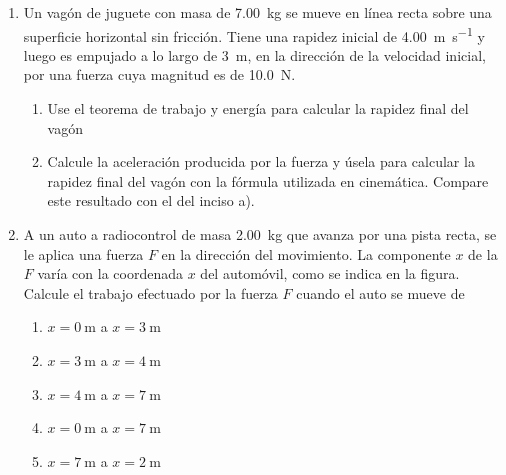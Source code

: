 \documentclass[Física - Práctica.root.tex]{subfiles}
\begin{document}
\begin{enumerate}
\begin{enumerate}
        \end{enumerate}

  \item Un vagón de juguete con masa de \SI{7,00}{\kilo\gram} se mueve en línea recta sobre una superficie
        horizontal sin fricción. Tiene una rapidez inicial de \SI{4,00}{\meter\per\second} y luego es empujado a lo
        largo de \SI{3}{\meter}, en la dirección de la velocidad inicial, por una fuerza cuya magnitud es de
        \SI{10,0}{\newton}.
        \begin{enumerate}
          \item Use el teorema de trabajo y energía para calcular la rapidez final del vagón
          \item Calcule la aceleración producida por la fuerza y úsela para calcular la rapidez final
                del vagón con la fórmula utilizada en cinemática. Compare este resultado con el del
                inciso a).
        \end{enumerate}

  \item A un auto a radiocontrol de masa \SI{2,00}{\kilo\gram} que avanza por una pista recta, se le aplica una
        fuerza $F$ en la dirección del movimiento. La componente $x$ de la $F$ varía con la coordenada
        $x$ del automóvil, como se indica en la figura. Calcule el trabajo efectuado por la fuerza $F$
        cuando el auto se mueve de
        \begin{multicols}{2}
          \begin{enumerate}
            \item $x = \SI{0}{\meter}$ a $x = \SI{3}{\meter}$
            \item $x = \SI{3}{\meter}$ a $x = \SI{4}{\meter}$
            \item $x = \SI{4}{\meter}$ a $x = \SI{7}{\meter}$
            \item $x = \SI{0}{\meter}$ a $x = \SI{7}{\meter}$
            \item $x = \SI{7}{\meter}$ a $x = \SI{2}{\meter}$
          \end{enumerate}
\end{multicols}
\end{enumerate}
\end{document}
